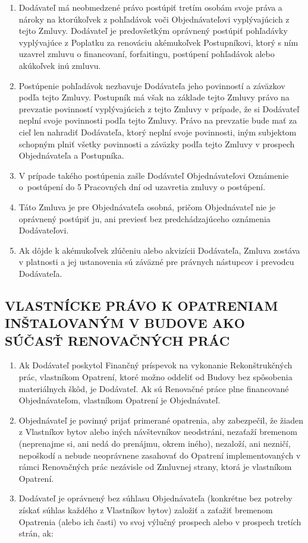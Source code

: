 \begin{multicols}{2}
\begin{enumerate}
\def\labelenumi{\arabic{enumi}.}
\item
  Dodávateľ má neobmedzené právo postúpiť tretím osobám svoje práva a
  nároky na ktorúkoľvek z pohľadávok voči Objednávateľovi vyplývajúcich
  z tejto Zmluvy. Dodávateľ je predovšetkým oprávnený postúpiť
  pohľadávky vyplývajúce z Poplatku za renováciu akémukoľvek
  Postupníkovi, ktorý s ním uzavrel zmluvu o financovaní, forfaitingu,
  postúpení pohľadávok alebo akúkoľvek inú zmluvu.
\item
  Postúpenie pohľadávok nezbavuje Dodávateľa jeho povinností a záväzkov
  podľa tejto Zmluvy. Postupník má však na základe tejto Zmluvy právo na
  prevzatie povinností vyplývajúcich z tejto Zmluvy v prípade, že si
  Dodávateľ neplní svoje povinnosti podľa tejto Zmluvy. Právo na
  prevzatie bude mať za cieľ len nahradiť Dodávateľa, ktorý neplní svoje
  povinnosti, iným subjektom schopným plniť všetky povinnosti a záväzky
  podľa tejto Zmluvy v prospech Objednávateľa a Postupníka.
\item
  V prípade takého postúpenia zašle Dodávateľ Objednávateľovi Oznámenie
  o~postúpení do 5 Pracovných dní od uzavretia zmluvy o postúpení.
\item
  Táto Zmluva je pre Objednávateľa osobná, pričom Objednávateľ nie je
  oprávnený postúpiť ju, ani previesť bez predchádzajúceho oznámenia
  Dodávateľovi.
\item
  Ak dôjde k akémukoľvek zlúčeniu alebo akvizícii Dodávateľa, Zmluva
  zostáva v platnosti a jej ustanovenia sú záväzné pre právnych
  nástupcov i prevodcu Dodávateľa.
\end{enumerate}

\subsection{VLASTNÍCKE PRÁVO K OPATRENIAM INŠTALOVANÝM V BUDOVE AKO SÚČASŤ RENOVAČNÝCH PRÁC}

\begin{enumerate}
\def\labelenumi{\arabic{enumi}.}
\item
  Ak Dodávateľ poskytol Finančný príspevok na vykonanie Rekonštrukčných
  prác, vlastníkom Opatrení, ktoré možno oddeliť od Budovy bez
  spôsobenia materiálnych škôd, je Dodávateľ. Ak sú Renovačné práce plne
  financované Objednávateľom, vlastníkom Opatrení je Objednávateľ.
\item
  Objednávateľ je povinný prijať primerané opatrenia, aby zabezpečil, že
  žiaden z Vlastníkov bytov alebo iných návštevníkov neodstráni,
  nezaťaží bremenom (neprenajme si, ani nedá do prenájmu, okrem iného),
  nezaloží, ani nezničí, nepoškodí a nebude neoprávnene zasahovať do
  Opatrení implementovaných v rámci Renovačných prác nezávisle od
  Zmluvnej strany, ktorá je vlastníkom Opatrení.
\item
  Dodávateľ je oprávnený bez súhlasu Objednávateľa (konkrétne bez
  potreby získať súhlas každého z Vlastníkov bytov) založiť a zaťažiť
  bremenom Opatrenia (alebo ich časti) vo svoj výlučný prospech alebo v
  prospech tretích strán, ak:


\end{enumerate}
\end{multicols}
